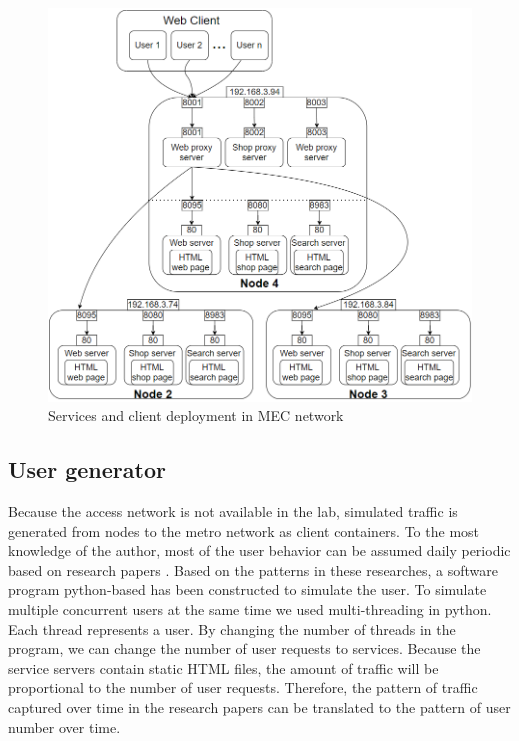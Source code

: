 \documentclass[conference]{IEEEtran}
\begin{document}
\begin{figure}[]
    \centering
    \includegraphics[scale = 0.36]{imgs/metro_network_deployment.png}
    \caption{Services and client deployment in MEC network}
    \label{fig:metro_network_deployment}
\end{figure}

\subsection{User generator}

Because the access network is not available in the lab, simulated traffic is generated from nodes to the metro network as client containers. To the most knowledge of the author, most of the user behavior can be assumed daily periodic based on research papers \cite{Kooti2016, Ullah2012, Taghavi2012, Yu2006}. Based on the patterns in these researches, a software program python-based has been constructed to simulate the user. To simulate multiple concurrent users at the same time we used multi-threading in python. Each thread represents a user. By changing the number of threads in the program, we can change the number of user requests to services. Because the service servers contain static HTML files, the amount of traffic will be proportional to the number of user requests. Therefore, the pattern of traffic captured over time in the research papers can be translated to the pattern of user number over time. 
\end{document}
